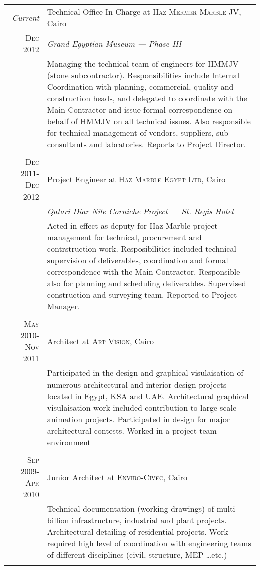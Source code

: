\documentclass[a4paper,11pt]{article} %
\begin{document}
\begin{tabular}{r|p{11cm}}
\emph{Current} & Technical Office In-Charge at \textsc{Haz Mermer Marble JV}, Cairo\\
\textsc{Dec 2012} & \emph{Grand Egyptian Museum --- Phase III}\\ 
& \footnotesize{Managing the technical team of engineers for HMMJV (stone subcontractor). Responsibilities include Internal Coordination with planning, commercial, quality and construction heads, and delegated to coordinate with the Main Contractor and issue formal correspondense on behalf of HMMJV on all technical issues. Also responsible for technical management of vendors, suppliers, sub-consultants and labratories. Reports to Project Director.}\\
\multicolumn{2}{c}{} \\


\textsc{Dec 2011-Dec 2012} & Project Engineer at \textsc{Haz Marble Egypt Ltd}, Cairo \\
& \emph{Qatari Diar Nile Corniche Project --- St. Regis Hotel} \\
& \footnotesize{Acted in effect as deputy for Haz Marble project management for technical, procurement and contrstruction work. Resposibilities included technical supervision of deliverables, coordination and formal correspondence with the Main Contractor. Responsible also for planning and scheduling deliverables. Supervised construction and surveying team. Reported to Project Manager.}\\
\multicolumn{2}{c}{} \\


\textsc{May 2010-Nov 2011} & Architect at \textsc{Art Vision}, Cairo \emph{}\\
& \footnotesize{Participated in the design and graphical visulaisation of numerous architectural and interior design projects located in Egypt, KSA and UAE. Architectural graphical visulaisation work included contribution to large scale animation projects. Participated in design for major architectural contests. Worked in a project team environment}\\
\multicolumn{2}{c}{} \\



\textsc{Sep 2009-Apr 2010} & Junior Architect at \textsc{Enviro-Civec}, Cairo \emph{}\\
& \footnotesize{Technical documentation (working drawings) of multi-billion infrastructure, industrial and plant projects. Architectural detailing of residential projects. Work required high level of coordination with engineering teams of different disciplines (civil, structure, MEP \ldots{}etc.)}\\
\multicolumn{2}{c}{} \\



\end{tabular}
\end{document}
